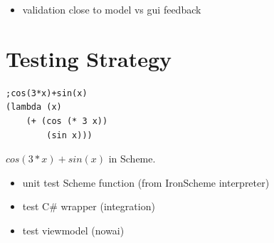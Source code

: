\documentclass[a4paper,12pt]{article}
\begin{document}
\begin{itemize}
\item validation close to model vs gui feedback
\end{itemize}
		
\section{Testing Strategy}	

\begin{listing}[H]
\begin{verbatim}
;cos(3*x)+sin(x)
(lambda (x)
	(+ (cos (* 3 x))
		(sin x)))
\end{verbatim}	

\caption{$cos(3*x)+sin(x)$ in Scheme.}
\label{lst:Scheme1}
\end{listing}

\begin{itemize}
\item unit test Scheme function (from IronScheme interpreter)
\item test C\# wrapper (integration)
\item test viewmodel (nowai)
\end{itemize}
	
\end{document}
